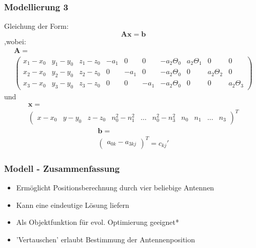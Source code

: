 \begin{frame}
  	\frametitle{Modellierung 3}
	Gleichung der Form:
	\[\mathbf{A}\mathbf{x}=\mathbf{b}\]  
	,wobei:
	\begin{multline}
	\mathbf{A}=\\
	\left(
		\begin{array}{cccccccccc}
			x_1-x_0 & y_1-y_0 & z_1-z_0 & -a_1 & 0 & 0 & -a_2\Theta_0 & a_2\Theta_1 & 0 & 0 \\
			x_2-x_0 & y_2-y_0 & z_2-z_0 & 0 & -a_1 & 0 & -a_2\Theta_0& 0 & a_2\Theta_2 & 0 \\
			x_3-x_0 & y_3-y_0 & z_3-z_0 & 0 & 0 & -a_1 & -a_2\Theta_0& 0 & 0 & a_2\Theta_3
		\end{array}
	\right) \nonumber
	\end{multline}
	und
	\begin{multline}
	\mathbf{x}=\\
	\left(
		\begin{array}{cccccccccc}
			x-x_0 & y-y_0 & z-z_0 &	n_0^2-n_1^2	& \dots	& n_0^2-n_3^2 & n_0 & n_1 & \dots &	n_3	
		\end{array}
	\right)^T\nonumber
	\end{multline}
	\begin{multline}
		\mathbf{b}=\\
		\left(
			\begin{array}{c}
				a_{0k}-a_{3kj} 
			\end{array}
			\right)^T
			= c_{kj}'\nonumber
		\end{multline}
\end{frame}
\begin{frame}
%
  	\frametitle{Modell - Zusammenfassung}
  	\begin{itemize}
		\item Ermöglicht Positionsberechnung durch vier beliebige Antennen 
		\item Kann eine eindeutige Lösung liefern
		\item Als Objektfunktion für evol. Optimierung geeignet*
		\item 'Vertauschen' erlaubt Bestimmung der Antennenposition
  	\end{itemize}
%  	
\end{frame}
